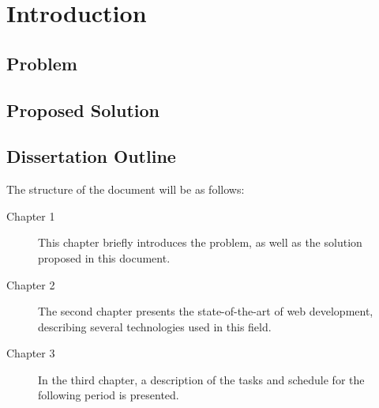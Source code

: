 
%

\chapter{Introduction}
\label{cha:introduction}


\section{Problem}

\section{Proposed Solution}

\section{Dissertation Outline}
The structure of the document will be as follows:

\begin{description}
	\item[Chapter 1 ] This chapter briefly introduces the problem, as well as the
	      solution proposed in this document.
	\item[Chapter 2 ] The second chapter presents the state-of-the-art of web
	      development, describing several technologies used in this field.
	\item[Chapter 3 ] In the third chapter, a description of the tasks and
	      schedule for the following period is presented.
\end{description}
